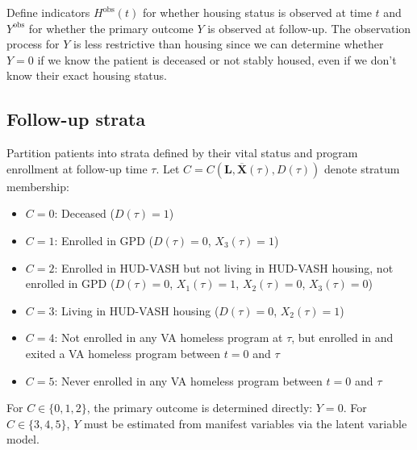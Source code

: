 Define indicators $H^{\text{obs}}(t)$ for whether housing status is observed at time $t$ and $Y^{\text{obs}}$ for whether the primary outcome $Y$ is observed at follow-up.
The observation process for $Y$ is less restrictive than housing since we can determine whether $Y=0$ if we know the patient is deceased or not stably housed, even if we don't know their exact housing status.



\subsection{Follow-up strata}

Partition patients into strata defined by their vital status and program enrollment at follow-up time $\tau$. Let $C = C(\boldsymbol{L}, \overline{\boldsymbol{X}}(\tau), D(\tau))$ denote stratum membership:

\begin{itemize}
    \item $C = 0$: Deceased ($D(\tau) = 1$)
    \item $C = 1$: Enrolled in GPD ($D(\tau) = 0$, $X_3(\tau) = 1$)
    \item $C = 2$: Enrolled in HUD-VASH but not living in HUD-VASH housing, not enrolled in GPD ($D(\tau) = 0$, $X_1(\tau) = 1$, $X_2(\tau) = 0$, $X_3(\tau) = 0$)
    \item $C = 3$: Living in HUD-VASH housing ($D(\tau) = 0$, $X_2(\tau) = 1$)
    \item $C = 4$: Not enrolled in any VA homeless program at $\tau$, but enrolled in and exited a VA homeless program between $t = 0$ and $\tau$
    \item $C = 5$: Never enrolled in any VA homeless program between $t = 0$ and $\tau$
\end{itemize}

For $C \in \{0, 1, 2\}$, the primary outcome is determined directly: $Y = 0$. For $C \in \{3, 4, 5\}$, $Y$ must be estimated from manifest variables via the latent variable model.
